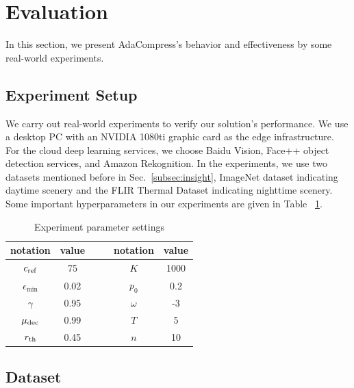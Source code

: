 \section{Evaluation}
\label{sec: evaluation}

In this section, we present AdaCompress's behavior and effectiveness by some real-world experiments. %

\subsection{Experiment Setup}

We carry out real-world experiments to verify our solution's performance. We use a desktop PC with an NVIDIA 1080ti graphic card as the edge infrastructure. For the cloud deep learning services, we choose Baidu Vision, Face++ object detection services, and Amazon Rekognition. In the experiments, we use two datasets mentioned before in Sec.~\ref{subsec:insight}, ImageNet dataset indicating daytime scenery and the FLIR Thermal Dataset indicating nighttime scenery. Some important hyperparameters in our experiments are given in Table ~\ref{tab: parameters}.

\begin{table}[H]
    \centering
    \begin{tabular}{cccccc}
        \toprule
        notation          & value & & & notation     & value  \\ \midrule
        $c_{\rm ref}$ & 75    & & & $K$      & 1000   \\
        $\epsilon_{\min}$    & 0.02  & & & $p_0$    & 0.2    \\
        $\gamma$      & 0.95  & & & $\omega$ & -3   \\
        $ \mu_{\rm dec} $ & 0.99 & & & $ T $ & 5  \\
        $r_{\rm th}$  & 0.45   & & &   $ n  $  &  10      \\ \bottomrule
    \end{tabular}
    \caption{Experiment parameter settings}
    \label{tab: parameters}
\end{table}

\subsection{Dataset}

